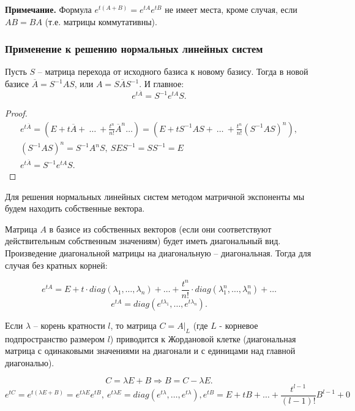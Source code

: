 \textbf{Примечание.} Формула $e^{t(A+B)} = e^{tA}e^{tB}$ не имеет места, кроме случая, если $AB = BA$ (т.е. матрицы коммутативны).

\subsubsection{Применение к решению нормальных линейных систем}

\begin{theorem}
    Пусть $S$ -- матрица перехода от исходного базиса к новому базису. Тогда в новой базисе $\overline{A} = S^{-1}AS$, или $A = S\overline{A}S^{-1}$. И главное:
    \[e^{t\overline{A}} = S^{-1}e^{tA}S.\]
\end{theorem}

\begin{proof}
    \begin{equation*}
        \begin{gathered}
            e^{t\overline{A}} = \left(E + t\overline{A} +\ \dots\ + \frac{t^{n}}{n!}\overline{A}^{n} \dots \right) = \left(E + tS^{-1}AS +\ \dots\ + \frac{t^{n}}{n!}(S^{-1}AS)^{n}\right), \\
            (S^{-1}AS)^n = S^{-1}A^nS,\ SES^{-1} = SS^{-1} = E \\
            e^{t\overline{A}} = S^{-1}e^{tA}S.
        \end{gathered}
    \end{equation*}
\end{proof}

Для решения нормальных линейных систем методом матричной экспоненты мы будем находить собственные вектора.

Матрица $A$ в базисе из собственных векторов (если они соответствуют действительным собственным значениям) будет иметь диагональный вид. Произведение диагональной матрицы на диагональную -- диагональная. Тогда для случая без кратных корней:

\[ e^{tA} = E + t\cdot diag(\lambda_1, \dots, \lambda_n) + \dots + \frac{t^n}{n!}\cdot diag(\lambda_1^n, \dots , \lambda_n^n) + \dots\]
\[ e^{tA} = diag(e^{t\lambda_1}, \dots, e^{t\lambda_n}).\]

Если $\lambda$ -- корень кратности $l$, то матрица $C = A|_{L}$ (где $L$ - корневое подпространство размером $l$)  приводится к Жордановой клетке (диагональная матрица с одинаковыми значениями на диагонали и с единицами над главной диагональю).

\[ C = \lambda E + B \Rightarrow B = C - \lambda E. \]
\[ e^{tC} = e^{t(\lambda E + B)} = e^{t\lambda E}e^{tB},\ e^{t\lambda E} = diag(e^{t\lambda}, \dots, e^{t\lambda}), e^{tB} = E + tB + \dots + \frac{t^{l-1}}{(l-1)!}B^{l-1} + 0 \]

